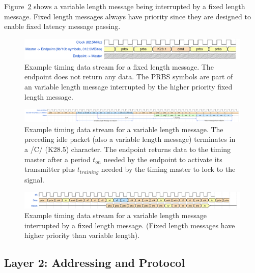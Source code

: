\documentclass[a4paper,11pt]{article}
\begin{document}
Figure~\ref{fig:wave-variable-length} shows a variable length message being interrupted by a fixed length message. Fixed length messages always have priority since they are designed to enable fixed latency message passing.

\begin{landscape}
\begin{figure}[h]
	\centering
	\includegraphics[width=\linewidth]{dts_sp-fixed-length-message.pdf}
	\caption{Example timing data stream for a fixed length message. The endpoint does not return any data. The PRBS symbols are part of an variable length message interrupted by the higher priority fixed length message.}
	\label{fig:wave-fixed-length}
\end{figure}

\begin{figure}[h]
	\centering
	\includegraphics[width=\linewidth]{dts_sp-variable-length-message_ed.pdf}
	\caption{Example timing data stream for a variable length message. The preceding idle packet (also a variable length message) terminates in a /C/ (K28.5) character. The endpoint returns data to the timing master after a period $t_{\mathrm on}$ needed by the endpoint to activate its transmitter plus $t_{\mathrm training}$ needed by the timing master to lock to the signal.}
	\label{fig:wave-variable-length}
\end{figure}

\begin{figure}[h]
	\centering
	\includegraphics[width=\linewidth]{timing_protocol_wavedrom_01.pdf}
	\caption{Example timing data stream for a variable length message interrupted by a fixed length message. (Fixed length messages have higher priority than variable length).}
	\label{fig:wave-interupted-message}
\end{figure}
\end{landscape}


\subsection{Layer 2: Addressing and Protocol}
\end{document}
